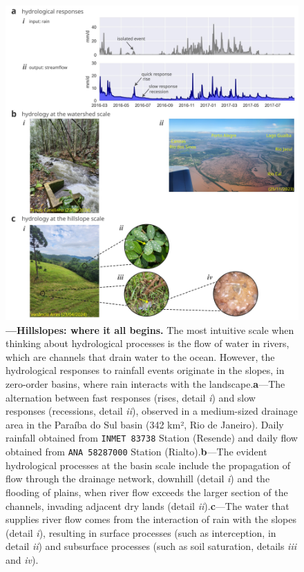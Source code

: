 \documentclass[./main_en.tex]{subfiles}
\begin{document}
\begin{figure}[t!] 
\centering				
\includegraphics[width=0.98\linewidth]{figs/fig_zero_en.jpg}		
\caption[Hillslopes: where it all begins]
{\textbf{---\;Hillslopes: where it all begins.}
    The most intuitive scale when thinking about hydrological processes is the flow of water in rivers, which are channels that drain water to the ocean. However, the hydrological responses to rainfall events originate in the slopes, in zero-order basins, where rain interacts with the landscape.\;\textbf{a}\;---\;The alternation between fast responses (rises, detail \textrm{\textit{i}}) and slow responses (recessions, detail \textrm{\textit{ii}}), observed in a medium-sized drainage area in the Paraíba do Sul basin (342 km², Rio de Janeiro). Daily rainfall obtained from \texttt{INMET 83738} Station (Resende) and daily flow obtained from \texttt{ANA 58287000} Station (Rialto).\;\textbf{b}\;---\;The evident hydrological processes at the basin scale include the propagation of flow through the drainage network, downhill (detail \textrm{\textit{i}}) and the flooding of plains, when river flow exceeds the larger section of the channels, invading adjacent dry lands (detail \textrm{\textit{ii}}).\;\textbf{c}\;---\;The water that supplies river flow comes from the interaction of rain with the slopes (detail \textrm{\textit{i}}), resulting in surface processes (such as \gls{interception}, in detail \textrm{\textit{ii}}) and subsurface processes (such as soil saturation, details \textrm{\textit{iii}} and \textrm{\textit{iv}}). 
}
\label{fig:hydro:intro} 		
\end{figure}
\end{document}
